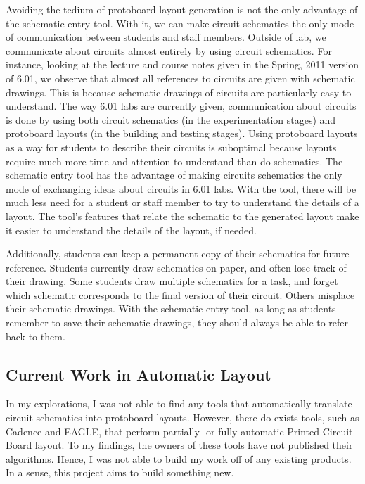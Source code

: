 Avoiding the tedium of protoboard layout generation is not the only advantage of
the schematic entry tool. With it, we can make circuit schematics the only mode
of communication between students and staff members. Outside of lab, we
communicate about circuits almost entirely by using circuit schematics. For
instance, looking at the lecture and course notes given in the Spring, 2011
version of 6.01\cite{ocw601}, we observe that almost all references to circuits
are given with schematic drawings. This is because schematic drawings of
circuits are particularly easy to understand. The way 6.01 labs are currently
given,
communication about circuits is done by using both circuit schematics (in the
experimentation stages) and protoboard layouts (in the building and testing
stages). Using protoboard layouts as a way for students to describe their
circuits is suboptimal because layouts require much more time and attention
to understand than do schematics. The schematic entry tool has the advantage of
making circuits schematics the only mode of exchanging ideas about circuits in
6.01 labs. With the tool, there will be much less need for a student or staff
member to try to understand the details of a layout. The tool's features that
relate the schematic to the generated layout make it easier to understand the
details of the layout, if needed.

Additionally, students can
keep a permanent copy of their schematics for future reference. Students
currently draw schematics on paper, and often lose track of their drawing. Some
students draw multiple schematics for a task, and forget which schematic
corresponds to the final version of their circuit.
Others misplace their schematic drawings. With the
schematic entry tool, as long as students remember to save their schematic
drawings, they should always be able to refer back to them.

\subsection{Current Work in Automatic Layout}
\label{sec:prev_layout}

In my explorations, I was not able to find any tools that
automatically translate circuit schematics into protoboard layouts.
However, there
do exists tools, such as Cadence\cite{cadence} and EAGLE\cite{eagle},
that perform partially- or fully-automatic Printed Circuit
Board layout. To my findings, the owners of these tools have not published
their algorithms. Hence, I was not able to build my
work off of any existing products. In a sense, this project aims to build
something new.

\newpage\null\newpage
